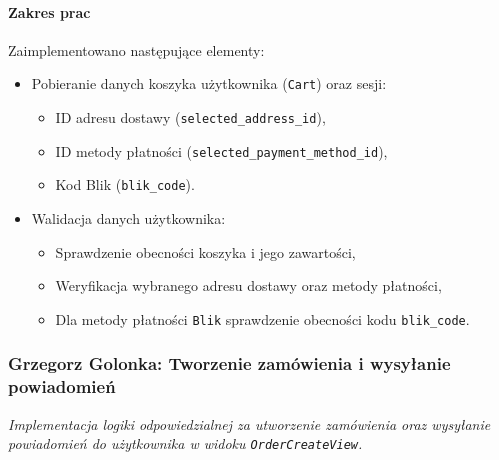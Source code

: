 \documentclass[12pt,a4paper,oneside]{article}
\theoremstyle{definition}
\numberwithin{equation}{section}
\begin{document}
\paragraph{Zakres prac}
Zaimplementowano następujące elementy:
\begin{itemize}
    \item Pobieranie danych koszyka użytkownika (\texttt{Cart}) oraz sesji:
    \begin{itemize}
        \item ID adresu dostawy (\texttt{selected\_address\_id}),
        \item ID metody płatności (\texttt{selected\_payment\_method\_id}),
        \item Kod Blik (\texttt{blik\_code}).
    \end{itemize}
    \item Walidacja danych użytkownika:
    \begin{itemize}
        \item Sprawdzenie obecności koszyka i jego zawartości,
        \item Weryfikacja wybranego adresu dostawy oraz metody płatności,
        \item Dla metody płatności \texttt{Blik} sprawdzenie obecności kodu \texttt{blik\_code}.
    \end{itemize}
\end{itemize}
% 
% 
\subsubsection{Grzegorz Golonka: Tworzenie zamówienia i wysyłanie powiadomień}
\label{section:1.3.25}
\textit{
Implementacja logiki odpowiedzialnej za utworzenie zamówienia oraz wysyłanie powiadomień do użytkownika w widoku \texttt{OrderCreateView}.
}
\end{document}
